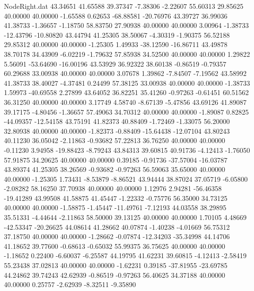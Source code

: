 \begin{filecontents}{NodeRight.dat}
  43.34651   41.65588   39.37347    -7.38306   -2.22607   55.60313   29.85625   40.00000   40.00000   -1.65588    0.62653  -68.88581  -20.76976
  43.39727   36.99036   41.38733    -1.36657   -1.18750   58.83750   27.90938   40.00000   40.00000    3.00964   -1.38733  -12.43796  -10.80820
  43.44794   41.25305   38.50067    -4.30319   -1.90375   56.52188   29.85312   40.00000   40.00000   -1.25305    1.49933  -38.12590  -16.86711
  43.49878   38.70178   34.43909    -6.02219   -1.79632   57.85938   34.52500   40.00000   40.00000    1.29822    5.56091  -53.64690  -16.00196
  43.53929   36.92322   38.60138    -0.86519   -0.79357   60.29688   33.00938   40.00000   40.00000    3.07678    1.39862   -7.84507   -7.19562
  43.58992   41.38733   38.40027    -4.37481    0.24499   57.38125   33.00938   40.00000   40.00000   -1.38733    1.59973  -40.69558    2.27899
  43.64052   36.82251   35.41260    -0.97263   -0.61451   60.51562   36.31250   40.00000   40.00000    3.17749    4.58740   -8.67139   -5.47856
  43.69126   41.89087   39.17175    -4.80456   -1.36657   57.49063   34.70312   40.00000   40.00000   -1.89087    0.82825  -44.09357  -12.54158
  43.75191   41.82373   40.88409    -1.72469   -1.33075   56.20000   32.80938   40.00000   40.00000   -1.82373   -0.88409  -15.64438  -12.07104
  43.80243   40.11230   36.05042    -2.11863   -0.93682   57.22813   36.76250   40.00000   40.00000   -0.11230    3.94958  -19.88423   -8.79243
  43.84313   39.60815   40.91736    -4.12413   -1.76050   57.91875   34.20625   40.00000   40.00000    0.39185   -0.91736  -37.57004  -16.03787
  43.89374   41.25305   38.26569    -0.93682   -0.97263   56.59063   35.65000   40.00000   40.00000   -1.25305    1.73431   -8.53879   -8.86521
  43.94444   38.87024   37.05719    -6.05800   -2.08282   58.16250   37.70938   40.00000   40.00000    1.12976    2.94281  -56.46358  -19.41289
  43.99508   41.58875   41.45447    -1.22332   -0.75776   56.35000   34.73125   40.00000   40.00000   -1.58875   -1.45447  -11.49761   -7.12193
  44.03558   38.29895   35.51331    -4.44644   -2.11863   58.50000   39.13125   40.00000   40.00000    1.70105    4.48669  -42.53347  -20.26625
  44.08614   41.28662   40.07874    -1.40238   -4.01669   56.75312   37.18750   40.00000   40.00000   -1.28662   -0.07874  -12.34203  -35.34998
  44.14706   41.18652   39.77600    -0.68613   -0.65032   55.99375   36.75625   40.00000   40.00000   -1.18652    0.22400   -6.60037   -6.25587
  44.19795   41.62231   39.60815    -4.12413   -2.58419   55.23438   37.02813   40.00000   40.00000   -1.62231    0.39185  -37.81955  -23.69785
  44.24862   39.74243   42.62939    -0.86519   -0.97263   56.40625   34.37188   40.00000   40.00000    0.25757   -2.62939   -8.32511   -9.35890

\end{filecontents}
